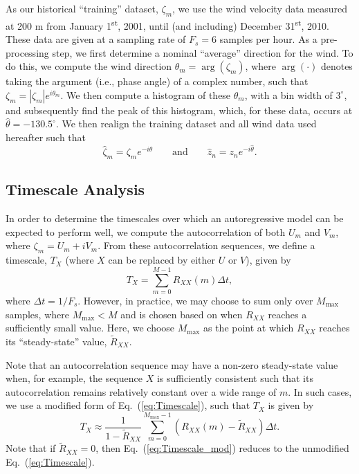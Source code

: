 \documentclass[11pt, oneside]{article}
\newcommand{\eqnref}[1]{Eq.~(\ref{#1})}
\begin{document}
As our historical ``training'' dataset, $\zeta_m$, we use the wind velocity data measured at 200 m from January 1\textsuperscript{st}, 2001, until (and including) December 31\textsuperscript{st}, 2010.
These data are given at a sampling rate of $F_s = 6$ samples per hour.
As a pre-processing step, we first determine a nominal ``average'' direction for the wind.
To do this, we compute the wind direction $\theta_m = \arg (\zeta_m)$, where $\arg ( \cdot )$ denotes taking the argument (i.e., phase angle) of a complex number, such that $\zeta_m = |\zeta_m| e^{i \theta_m}$.
We then compute a histogram of these $\theta_m$, with a bin width of $3^\circ$, and subsequently find the peak of this histogram, which, for these data, occurs at $\hat{\theta} = -130.5^\circ$. %
We then realign the training dataset and all wind data used hereafter such that
\begin{equation}
\hat{\zeta}_m = \zeta_m e^{-i\hat{\theta}}
\quad\quad \text{and} \quad\quad
\hat{z}_n = z_n e^{-i\hat{\theta}}.
\end{equation}

\subsection{Timescale Analysis}\label{sec:Methodology:Timescale}
In order to determine the timescales over which an autoregressive model can be expected to perform well, we compute the autocorrelation of both $U_m$ and $V_m$, where $\zeta_m = U_m + i V_m$.
From these autocorrelation sequences, we define a timescale, $T_X$ (where $X$ can be replaced by either $U$ or $V$), given by
\begin{equation}\label{eq:Timescale}
T_X = \sum_{m = 0}^{M-1} R_{XX}(m) \Delta t,
\end{equation} %
where $\Delta t = 1/F_s$.
However, in practice, we may choose to sum only over $M_\text{max}$ samples, where $M_\text{max} < M$ and is chosen based on when $R_{XX}$ reaches a sufficiently small value.
Here, we choose $M_\text{max}$ as the point at which $R_{XX}$ reaches its ``steady-state'' value, $\tilde{R}_{XX}$.

Note that an autocorrelation sequence may have a non-zero steady-state value when, for example, the sequence $X$ is sufficiently consistent such that its autocorrelation remains relatively constant over a wide range of $m$.
In such cases, we use a modified form of \eqnref{eq:Timescale}, such that $T_X$ is given by
\begin{equation}\label{eq:Timescale_mod}
T_X \approx \frac{1}{1 - \tilde{R}_{XX}} \sum_{m = 0}^{M_\text{max}-1} (R_{XX}(m) - \tilde{R}_{XX}) \Delta t.
\end{equation}
Note that if $\tilde{R}_{XX} = 0$, then \eqnref{eq:Timescale_mod} reduces to the unmodified \eqnref{eq:Timescale}.
\end{document}
